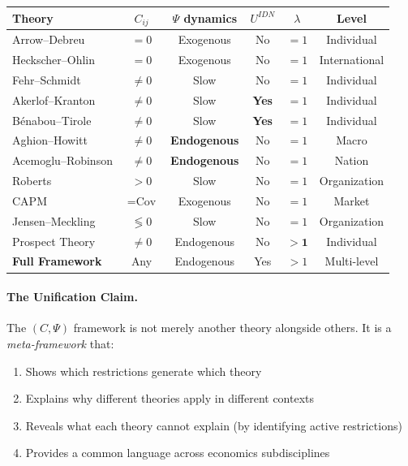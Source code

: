 \documentclass[12pt,a4paper]{article}
\begin{document}
\begin{center}
\renewcommand{\arraystretch}{1.2}
\small
\begin{tabular}{lccccc}
\hline
\textbf{Theory} & $C_{ij}$ & $\Psi$ dynamics & $U^{IDN}$ & $\lambda$ & Level \\
\hline
Arrow--Debreu & $= 0$ & Exogenous & No & $= 1$ & Individual \\
Heckscher--Ohlin & $= 0$ & Exogenous & No & $= 1$ & International \\
Fehr--Schmidt & $\neq 0$ & Slow & No & $= 1$ & Individual \\
Akerlof--Kranton & $\neq 0$ & Slow & \textbf{Yes} & $= 1$ & Individual \\
Bénabou--Tirole & $\neq 0$ & Slow & \textbf{Yes} & $= 1$ & Individual \\
Aghion--Howitt & $\neq 0$ & \textbf{Endogenous} & No & $= 1$ & Macro \\
Acemoglu--Robinson & $\neq 0$ & \textbf{Endogenous} & No & $= 1$ & Nation \\
Roberts & $> 0$ & Slow & No & $= 1$ & Organization \\
CAPM & $= \text{Cov}$ & Exogenous & No & $= 1$ & Market \\
Jensen--Meckling & $\lessgtr 0$ & Slow & No & $= 1$ & Organization \\
Prospect Theory & $\neq 0$ & Endogenous & No & $\mathbf{> 1}$ & Individual \\
\hline
\textbf{Full Framework} & Any & Endogenous & Yes & $> 1$ & Multi-level \\
\hline
\end{tabular}
\end{center}

\paragraph{The Unification Claim.}
The $(C, \Psi)$ framework is not merely another theory alongside others.
It is a \emph{meta-framework} that:
\begin{enumerate}
  \item Shows which restrictions generate which theory
  \item Explains why different theories apply in different contexts
  \item Reveals what each theory cannot explain (by identifying active restrictions)
  \item Provides a common language across economics subdisciplines
\end{enumerate}
\end{document}
